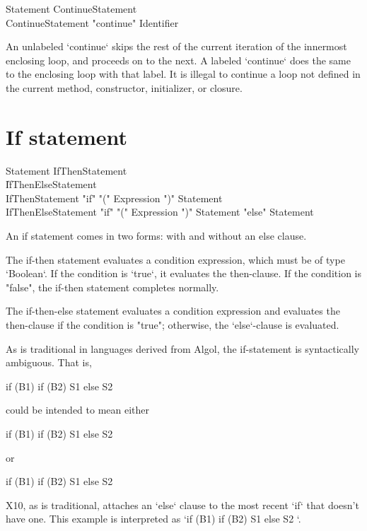 \begin{grammar}
Statement \: ContinueStatement \\
ContinueStatement \: \xcd"continue" Identifier\opt \\
\end{grammar}

An unlabeled \xcd`continue` skips the rest of the current iteration of the
innermost enclosing loop, and proceeds on to the next.  A labeled
\xcd`continue` does the same to the enclosing loop with that label.
It is illegal to continue a loop not defined in the current
method, constructor, initializer, or closure.

\section{If statement}

\begin{grammar}
Statement \: IfThenStatement \\
          \| IfThenElseStatement \\
IfThenStatement \: \xcd"if" \xcd"(" Expression \xcd")" Statement \\
IfThenElseStatement \: \xcd"if" \xcd"(" Expression \xcd")" Statement \xcd"else" Statement \\
\end{grammar}

An if statement comes in two forms: with and without an else
clause.

The if-then statement evaluates a condition expression, which must be of type
\xcd`Boolean`. If the condition is \xcd`true`, it evaluates the then-clause.
If the condition is \xcd"false", the if-then statement completes normally.

The if-then-else statement evaluates a condition expression and 
evaluates the then-clause if the condition is
\xcd"true"; otherwise, the \xcd`else`-clause is evaluated.

As is traditional in languages derived from Algol, the if-statement is syntactically
ambiguous.  That is, 
\begin{xten}
if (B1) if (B2) S1 else S2
\end{xten}
could be intended to mean either 
\begin{xten}
if (B1) { if (B2) S1 else S2 }
\end{xten} 
or 
\begin{xten}
if (B1) {if (B2) S1} else S2
\end{xten}
X10, as is traditional, attaches an \xcd`else` clause to the most recent
\xcd`if` that doesn't have one.
This example is interpreted as 
\xcd`if (B1) { if (B2) S1 else S2 }`. 



